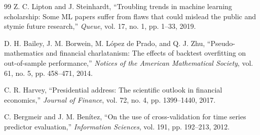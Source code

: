 \documentclass[conference]{IEEEtran}
\begin{document}
\begin{thebibliography}{99}
Z. C. Lipton and J. Steinhardt, ``Troubling trends in machine learning scholarship: Some ML papers suffer from flaws that could mislead the public and stymie future research,'' \textit{Queue}, vol. 17, no. 1, pp. 1--33, 2019.

D. H. Bailey, J. M. Borwein, M. L\'opez de Prado, and Q. J. Zhu, ``Pseudo-mathematics and financial charlatanism: The effects of backtest overfitting on out-of-sample performance,'' \textit{Notices of the American Mathematical Society}, vol. 61, no. 5, pp. 458--471, 2014.

C. R. Harvey, ``Presidential address: The scientific outlook in financial economics,'' \textit{Journal of Finance}, vol. 72, no. 4, pp. 1399--1440, 2017.

C. Bergmeir and J. M. Ben\'itez, ``On the use of cross-validation for time series predictor evaluation,'' \textit{Information Sciences}, vol. 191, pp. 192--213, 2012.

\end{thebibliography}

\balance
\end{document}

